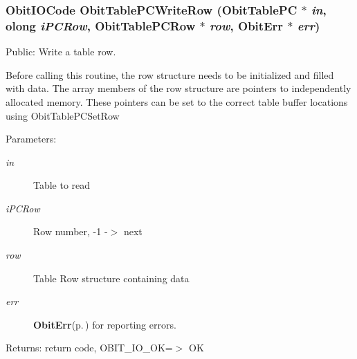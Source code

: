 \subsubsection{\setlength{\rightskip}{0pt plus 5cm}Obit\-IOCode Obit\-Table\-PCWrite\-Row ({\bf Obit\-Table\-PC} $\ast$ {\em in}, {\bf olong} {\em i\-PCRow}, {\bf Obit\-Table\-PCRow} $\ast$ {\em row}, {\bf Obit\-Err} $\ast$ {\em err})}\label{ObitTablePC_8c_a24}


Public: Write a table row. 

Before calling this routine, the row structure needs to be initialized and filled with data. The array members of the row structure are pointers to independently allocated memory. These pointers can be set to the correct table buffer locations using Obit\-Table\-PCSet\-Row \begin{Desc}
\item[Parameters:]
\begin{description}
\item[{\em in}]Table to read \item[{\em i\-PCRow}]Row number, -1 -$>$ next \item[{\em row}]Table Row structure containing data \item[{\em err}]{\bf Obit\-Err}{\rm (p.\,\pageref{structObitErr})} for reporting errors. \end{description}
\end{Desc}
\begin{Desc}
\item[Returns:]return code, OBIT\_\-IO\_\-OK=$>$ OK \end{Desc}
